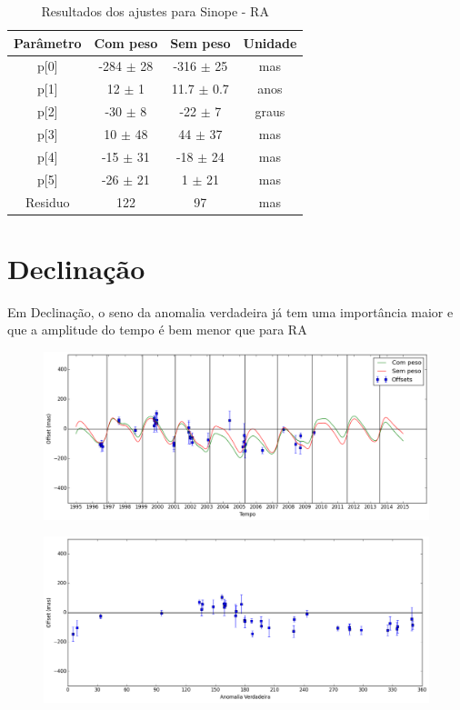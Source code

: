 \documentclass[11pt,a4paper]{report}
\begin{document}
\begin{table}[h!]
\caption{\label{Tab: Sinope-RA} Resultados dos ajustes para Sinope - RA}
\begin{centering}
\begin{tabular}{cccc}
\hline
\hline
Parâmetro & Com peso & Sem peso & Unidade\tabularnewline
\hline
p[0] & -284 $\pm$ 28 & -316 $\pm$ 25 & mas\\
p[1] & 12 $\pm$ 1 & 11.7 $\pm$ 0.7 & anos\\
p[2] & -30 $\pm$ 8 & -22 $\pm$ 7 & graus\\
p[3] & 10 $\pm$ 48 & 44 $\pm$ 37 & mas\\
p[4] & -15 $\pm$ 31 & -18 $\pm$ 24 & mas\\
p[5] & -26 $\pm$ 21 & 1 $\pm$ 21 & mas\\
Residuo & 122 & 97 & mas\\
\hline 
\end{tabular} 
\par\end{centering}
\end{table}

\section*{Declinação}

\indent \indent Em Declinação, o seno da anomalia verdadeira já tem uma importância maior e que a amplitude do tempo é bem menor que para RA

\begin{figure}[h]
\includegraphics[scale=0.45]{Sinope/DEC.png} 
\end{figure}

\begin{figure}[h]
\includegraphics[scale=0.45]{Sinope/DEC_anom.png}  
\end{figure}
\end{document}
